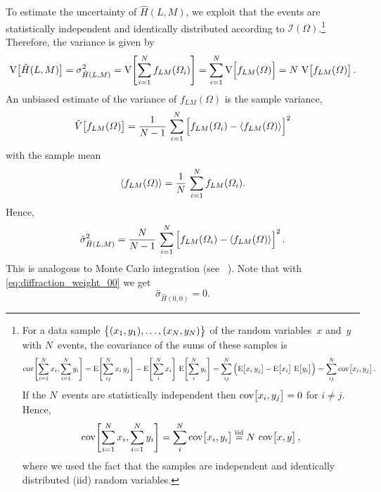 To estimate the uncertainty of $\hat{H}(L, M)$, we exploit that the
events are statistically independent and identically distributed
according to $\mathcal{I}(\Omega)$.\footnote{%
  For a data sample $\cBrk{(x_1, y_1), \ldots, (x_N, y_N)}$ of the
  random variables~$x$ and~$y$ with $N$~events, the covariance of the
  sums of these samples is
  \begin{equation}
    \cov[4]{\sum_{i = 1}^N x_i, \sum_{i = 1}^N y_i}
    = \exptVal[4]{\sum_{i j}^N x_i\, y_j} - \exptVal[4]{\sum_i^N x_i}\, \exptVal[4]{\sum_i^N y_i}
    = \sum_{i j}^N \rBrk[2]{\exptVal[1]{x_i\, y_j} - \exptVal[1]{x_i}\, \exptVal[1]{y_i}}
    = \sum_{i j}^N \cov[1]{x_i, y_j}.
  \end{equation}
  If the $N$~events are statistically independent then $\cov[1]{x_i,
  y_j} = 0$ for $i \neq j$.  Hence,
  \begin{equation}
    \cov[4]{\sum_{i = 1}^N x_i, \sum_{i = 1}^N y_i}
    = \sum_i^N \cov[1]{x_i, y_i}
    \equalUsing{\text{iid}} N\, \cov[1]{x, y},
  \end{equation}
  where we used the fact that the samples are independent and
  identically distributed (iid) random variables.
}  Therefore, the variance is given by
\begin{equation}
  \label{eq:diffraction_moments_var}
  \var[1]{\hat{H}(L, M)}
  = \sigma_{\hat{H}(L, M)}^2
  = \var[4]{\sum_{i = 1}^N f_{L M}(\Omega_i)}
  = \sum_{i = 1}^N \var[2]{f_{L M}(\Omega)}
  = N\, \var[1]{f_{L M}(\Omega)}.
\end{equation}
An unbiased estimate of the variance of $f_{L M}(\Omega)$ is the
sample variance, \ie
\begin{equation}
  \hat{V}\!\sBrk[1]{f_{L M}(\Omega)}
  = \frac{1}{N - 1}\, \sum_{i = 1}^N \sBrk[2]{f_{L M}(\Omega_i) - \mean{f_{L M}(\Omega)}}^2
\end{equation}
with the sample mean
\begin{equation}
  \langle{f_{L M}(\Omega)}\rangle
  = \frac{1}{N}\, \sum_{i = 1}^N f_{L M}(\Omega_i).
\end{equation}
Hence,
\begin{equation}
  \label{eq:diffraction_moments_stdDev}
  \hat{\sigma}_{\hat{H}(L, M)}^2
  = \frac{N}{N - 1}\, \sum_{i = 1}^N \sBrk[2]{f_{L M}(\Omega_i) - \mean{f_{L M}(\Omega)}}^2.
\end{equation}
This is analogous to Monte Carlo integration (see \eg\
).  Note that with
\cref{eq:diffraction_weight_00} we get
\begin{equation}
  \hat{\sigma}_{\hat{H}(0, 0)}
  = 0.
\end{equation}

